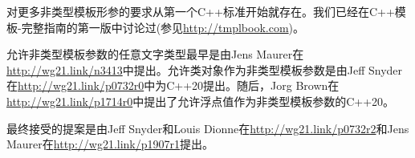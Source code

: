 
对更多非类型模板形参的要求从第一个C++标准开始就存在。我们已经在C++模板-完整指南的第一版中讨论过(参见\url{http://tmplbook.com})。

允许非类型模板参数的任意文字类型最早是由Jens Maurer在\url{http://wg21.link/n3413}中提出。允许类对象作为非类型模板参数是由Jeff Snyder在\url{http://wg21.link/p0732r0}中为C++20提出。随后，Jorg Brown在\url{http://wg21.link/p1714r0}中提出了允许浮点值作为非类型模板参数的C++20。

最终接受的提案是由Jeff Snyder和Louis Dionne在\url{http://wg21.link/p0732r2}和Jens Maurer在\url{http://wg21.link/p1907r1}提出。